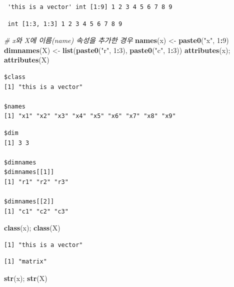 \documentclass[
  11pt,
]{krantz}
\newenvironment{Shaded}{\begin{snugshade}}{\end{snugshade}}
\newcommand{\CommentTok}[1]{\textcolor[rgb]{0.37,0.37,0.37}{\textit{#1}}}
\newcommand{\DecValTok}[1]{\textcolor[rgb]{0.06,0.06,0.06}{#1}}
\newcommand{\KeywordTok}[1]{\textcolor[rgb]{0.27,0.27,0.27}{\textbf{#1}}}
\newcommand{\NormalTok}[1]{#1}
\newcommand{\OperatorTok}[1]{\textcolor[rgb]{0.43,0.43,0.43}{\textbf{#1}}}
\newcommand{\StringTok}[1]{\textcolor[rgb]{0.5,0.5,0.5}{#1}}
\begin{document}
\begin{verbatim}
 'this is a vector' int [1:9] 1 2 3 4 5 6 7 8 9
\end{verbatim}

\begin{verbatim}
 int [1:3, 1:3] 1 2 3 4 5 6 7 8 9
\end{verbatim}

\begin{Shaded}
\begin{Highlighting}[]
\CommentTok{# x와 X에 이름(name) 속성을 추가한 경우}
\KeywordTok{names}\NormalTok{(x) <-}\StringTok{ }\KeywordTok{paste0}\NormalTok{(}\StringTok{"x"}\NormalTok{, }\DecValTok{1}\OperatorTok{:}\DecValTok{9}\NormalTok{)}
\KeywordTok{dimnames}\NormalTok{(X) <-}\StringTok{ }\KeywordTok{list}\NormalTok{(}\KeywordTok{paste0}\NormalTok{(}\StringTok{"r"}\NormalTok{, }\DecValTok{1}\OperatorTok{:}\DecValTok{3}\NormalTok{), }
                    \KeywordTok{paste0}\NormalTok{(}\StringTok{"c"}\NormalTok{, }\DecValTok{1}\OperatorTok{:}\DecValTok{3}\NormalTok{))}
\KeywordTok{attributes}\NormalTok{(x); }\KeywordTok{attributes}\NormalTok{(X)}
\end{Highlighting}
\end{Shaded}

\begin{verbatim}
$class
[1] "this is a vector"

$names
[1] "x1" "x2" "x3" "x4" "x5" "x6" "x7" "x8" "x9"
\end{verbatim}

\begin{verbatim}
$dim
[1] 3 3

$dimnames
$dimnames[[1]]
[1] "r1" "r2" "r3"

$dimnames[[2]]
[1] "c1" "c2" "c3"
\end{verbatim}

\begin{Shaded}
\begin{Highlighting}[]
\KeywordTok{class}\NormalTok{(x); }\KeywordTok{class}\NormalTok{(X)}
\end{Highlighting}
\end{Shaded}

\begin{verbatim}
[1] "this is a vector"
\end{verbatim}

\begin{verbatim}
[1] "matrix"
\end{verbatim}

\begin{Shaded}
\begin{Highlighting}[]
\KeywordTok{str}\NormalTok{(x); }\KeywordTok{str}\NormalTok{(X)}
\end{Highlighting}
\end{Shaded}
\end{document}
